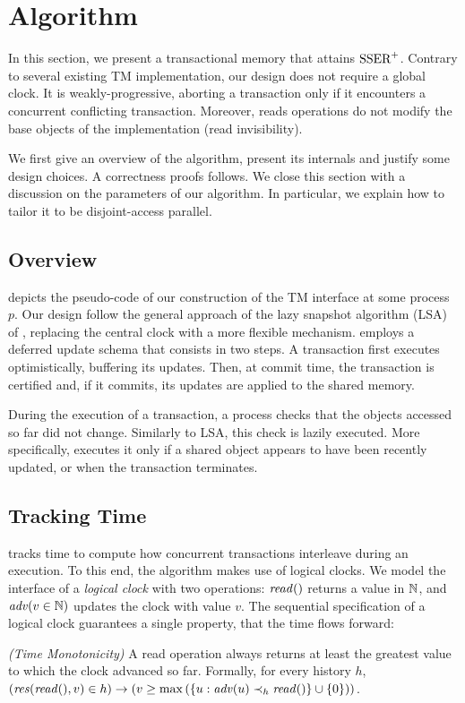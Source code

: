 \section{Algorithm}

In this section, we present a transactional memory that attains $\SPSER$.
Contrary to several existing TM implementation, our design does not require a global clock.
It is weakly-progressive, aborting a transaction only if it encounters a concurrent conflicting transaction.
Moreover, reads operations do not modify the base objects of the implementation (read invisibility).

We first give an overview of the algorithm, present its internals and justify some design choices.
A correctness proofs follows.
We close this section with a discussion on the parameters of our algorithm.
In particular, we explain how to tailor it to be disjoint-access parallel.

\subsection{Overview}

 depicts the pseudo-code of our construction of the TM interface at some process $p$.
Our design follow the general approach of the lazy snapshot algorithm (LSA) of \citet{FelberFMR10}, replacing the central clock with a more flexible mechanism.
 employs a deferred update schema that consists in two steps.
A transaction first executes optimistically, buffering its updates.
Then, at commit time, the transaction is certified and, if it commits, its updates are applied to the shared memory.

During the execution of a transaction, a process checks that the objects accessed so far did not change.
Similarly to LSA, this check is lazily executed.
More specifically,  executes it only if a shared object appears to have been recently updated, or when the transaction terminates.

\subsection{Tracking Time}

 tracks time to compute how concurrent transactions interleave during an execution.
To this end, the algorithm makes use of logical clocks.
We model the interface of a \emph{logical clock} with two operations: $\cread$ returns a value in $\naturalSet$, and $\cadv(v \in \naturalSet)$ updates the clock with value $v$.
The sequential specification of a logical clock guarantees a single property, that the time flows forward:
\begin{inparaenum}
\item[\emph{(Time Monotonicity)}]
  A read operation always returns at least the greatest value to which the clock advanced so far.
  Formally, for every history $h$, $(\responseAny{\cread}{v} \in h) \implies (v \geq \max{(\{u : \cadv(u) \hb_h \cread \} \union \{0\})})$.
\end{inparaenum}

